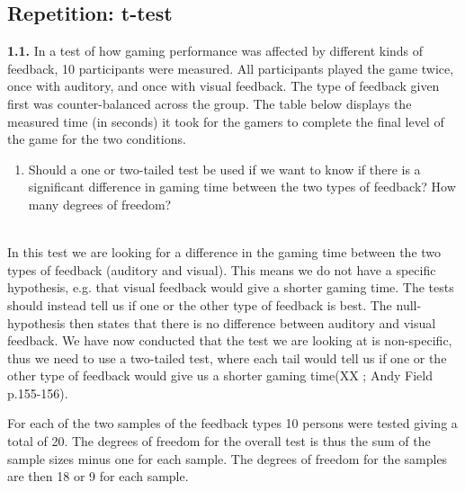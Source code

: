 \subsection{Repetition: t-test}
\noindent\colorbox{light-gray}{\begin{minipage}{0.98\textwidth}
\textbf{1.1.} In a test of how gaming performance was affected by different kinds of feedback, 10 participants were measured. All participants played the game twice, once with auditory, and once with visual feedback. The type of feedback given first was counter-balanced across the group. The table below displays the measured time (in seconds) it took for the gamers to complete the final level of the game for the two conditions.
\end{minipage}}

\noindent\colorbox{lighter-gray}{\begin{minipage}{0.98\textwidth}
\begin{enumerate}[label=\textbf{(\arabic*)}]\setcounter{enumi}{0}
	\item Should a one or two-tailed test be used if we want to know if there is a significant difference in gaming time between the two types of feedback? How many degrees of freedom?
\end{enumerate}\end{minipage}}

\hspace{0pt} \\
In this test we are looking for a difference in the gaming time between the two types of feedback (auditory and visual). This means we do not have a specific hypothesis, e.g. that visual feedback would give a shorter gaming time. The tests should instead tell us if one or the other type of feedback is best. The null-hypothesis then states that there is no difference between auditory and visual feedback. We have now conducted that the test we are looking at is non-specific, thus we need to use a two-tailed test, where each tail would tell us if one or the other type of feedback would give us a shorter gaming time(XX ; Andy Field p.155-156).

For each of the two samples of the feedback types 10 persons were tested giving a total of 20. The degrees of freedom for the overall test is thus the sum of the sample sizes minus one for each sample. The degrees of freedom for the samples are then 18 or 9 for each sample.

